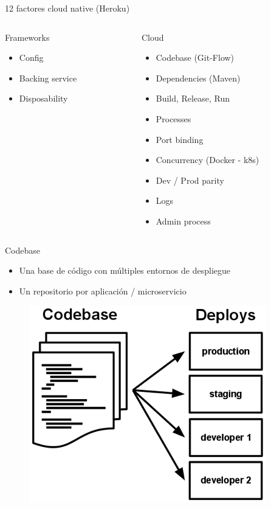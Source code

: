 \documentclass{beamer}
\begin{document}
\begin{frame}{12 factores cloud native (Heroku)}

\begin{columns}[T] %
	
	\begin{column}[T]{4cm} %
		\begin{alertblock}{Frameworks}
			\begin{itemize}
				\item Config
				\item Backing service
				\item Disposability
			\end{itemize}
		\end{alertblock}
	\end{column}
	\begin{column}[T]{6cm} %
		\begin{block}{Cloud}
			\begin{itemize}
				\item Codebase (Git-Flow)
				\item Dependencies (Maven)
				\item Build, Release, Run
				\item Processes
				\item Port binding
				\item Concurrency (Docker - k8s)
				\item Dev / Prod parity
				\item Logs
				\item Admin process
			\end{itemize}
		\end{block}
	\end{column}
\end{columns}

\end{frame}

\begin{frame}{Codebase}
\begin{itemize}
	\item Una base de código con múltiples entornos de despliegue
	\item Un repositorio por aplicación / microservicio
\end{itemize}

\begin{figure}
	\centering
	\includegraphics[width=0.5\linewidth]{Images/121}
\end{figure}
\end{frame}
\end{document}
